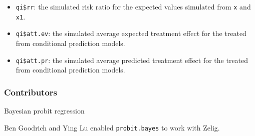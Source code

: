 \begin{itemize}
\begin{itemize}
\item \texttt{qi\$rr}: the simulated risk ratio for the expected values
simulated from \texttt{x} and \texttt{x1}.

\item \texttt{qi\$att.ev}: the simulated average expected treatment effect
for the treated from conditional prediction models.

\item \texttt{qi\$att.pr}: the simulated average predicted treatment effect
for the treated from conditional prediction models.
\end{itemize}
\end{itemize}

\subsubsection{Contributors}

Bayesian probit regression 

\noindent Ben Goodrich and Ying Lu enabled \texttt{probit.bayes} to work with Zelig.

